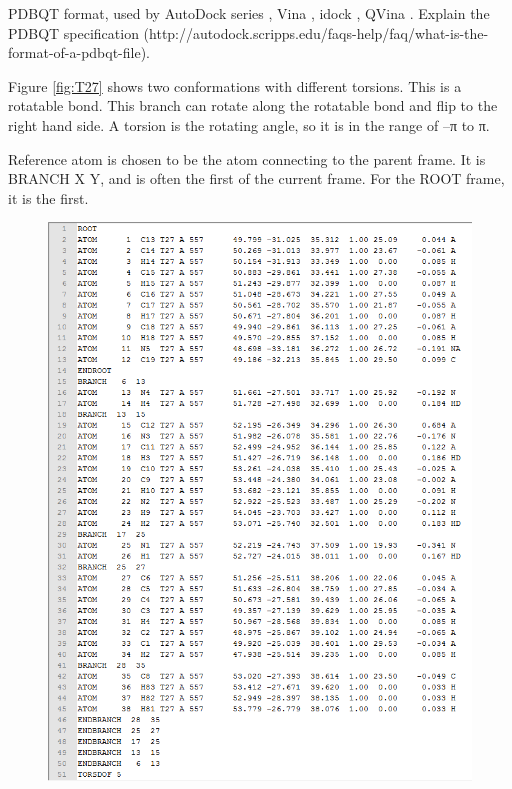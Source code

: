 \documentclass[twocolumn]{svjour3}          %
\begin{document}
PDBQT format, used by AutoDock series \cite{597,596}, Vina \cite{595}, idock \cite{1153}, QVina \cite{1193}. Explain the PDBQT specification (http://autodock.scripps.edu/faqs-help/faq/what-is-the-format-of-a-pdbqt-file).

Figure \ref{fig:T27} shows two conformations with different torsions. This is a rotatable bond. This branch can rotate along the rotatable bond and flip to the right hand side. A torsion is the rotating angle, so it is in the range of –π to π. 

Reference atom is chosen to be the atom connecting to the parent frame. It is BRANCH X Y, and is often the first of the current frame. For the ROOT frame, it is the first.

\begin{figure}
\centering
\includegraphics[width=1.36\textwidth,natwidth=700,natheight=922]{../usrt/T27CrystalPDBQT.png}
\endminipage
{}
\centering

\end{figure}
\end{document}
